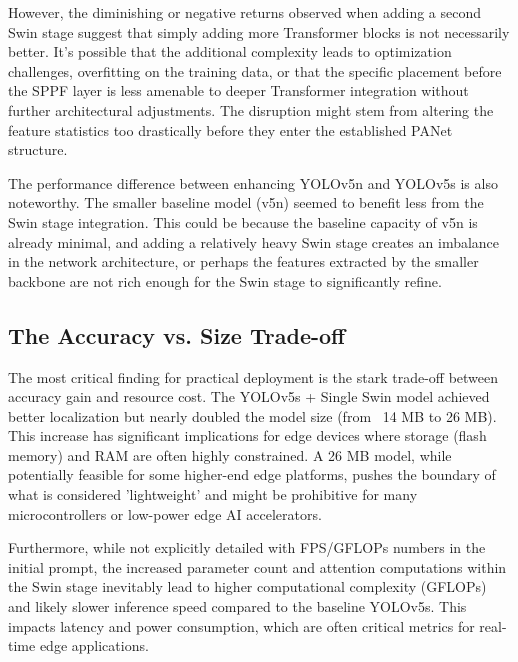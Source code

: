 \documentclass[conference]{IEEEtran}
\begin{document}
However, the diminishing or negative returns observed when adding a second Swin stage suggest that simply adding more Transformer blocks is not necessarily better. It's possible that the additional complexity leads to optimization challenges, overfitting on the training data, or that the specific placement before the SPPF layer is less amenable to deeper Transformer integration without further architectural adjustments. The disruption might stem from altering the feature statistics too drastically before they enter the established PANet structure.

The performance difference between enhancing YOLOv5n and YOLOv5s is also noteworthy. The smaller baseline model (v5n) seemed to benefit less from the Swin stage integration. This could be because the baseline capacity of v5n is already minimal, and adding a relatively heavy Swin stage creates an imbalance in the network architecture, or perhaps the features extracted by the smaller backbone are not rich enough for the Swin stage to significantly refine.

\subsection{The Accuracy vs. Size Trade-off}
The most critical finding for practical deployment is the stark trade-off between accuracy gain and resource cost. The YOLOv5s + Single Swin model achieved better localization but nearly doubled the model size (from ~14 MB to 26 MB). This increase has significant implications for edge devices where storage (flash memory) and RAM are often highly constrained. A 26 MB model, while potentially feasible for some higher-end edge platforms, pushes the boundary of what is considered 'lightweight' and might be prohibitive for many microcontrollers or low-power edge AI accelerators.

Furthermore, while not explicitly detailed with FPS/GFLOPs numbers in the initial prompt, the increased parameter count and attention computations within the Swin stage inevitably lead to higher computational complexity (GFLOPs) and likely slower inference speed compared to the baseline YOLOv5s. This impacts latency and power consumption, which are often critical metrics for real-time edge applications.
\end{document}
